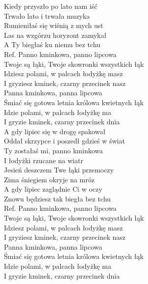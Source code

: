 \begin{flushleft}
Kiedy przyszło po lato nam iść \\
Trwało lato i trwała muzyka \\
Rumieniłaś się wiśnią z mych ust \\
Las na wzgórzu horyzont zamykał \\
A Ty biegłaś ku niemu bez tchu \\
\vskip 3mm
Ref. Panno kminkowa, panno lipcowa\\
\hspace{0.9cm}Twoje są łąki, Twoje skowronki wszystkich łąk \\
\hspace{0.9cm}Idziesz polami, w palcach łodyżkę masz \\
\hspace{0.9cm}I gryziesz kminek, czarny przecinek nasz \\
\vskip 3mm
\hspace{0.9cm}Panna kminkowa, panna lipcowa \\
\hspace{0.9cm}Śmiać się gotowa letnia królowa kwietnych łąk \\
\hspace{0.9cm}Idzie polami, w palcach łodyżkę ma \\
\hspace{0.9cm}I gryzie kminek, czarny przecinek dnia \\
\vskip 3mm
A gdy lipiec się w drogę spakował \\
Oddał skrzypce i poszedł gdzieś w świat \\
Ty zostałaś mi, panno kminkowa \\
I łodyżki rzucane na wiatr \\
\vskip 3mm
Jesień deszczem Twe łąki przemoczy \\
Zima śniegiem okryje na mróz \\
A gdy lipiec zaglądnie Ci w oczy \\
Znowu będziesz tak biegła bez tchu \\
\vskip 3mm
Ref. Panno kminkowa, panno lipcowa\\
\hspace{0.9cm}Twoje są łąki, Twoje skowronki wszystkich łąk \\
\hspace{0.9cm}Idziesz polami, w palcach łodyżkę masz \\
\hspace{0.9cm}I gryziesz kminek, czarny przecinek nasz \\
\vskip 3mm
\hspace{0.9cm}Panna kminkowa, panna lipcowa \\
\hspace{0.9cm}Śmiać się gotowa letnia królowa kwietnych łąk \\
\hspace{0.9cm}Idzie polami, w palcach łodyżkę ma \\
\hspace{0.9cm}I gryzie kminek, czarny przecinek dnia \\
\end{flushleft}
\clearpage
